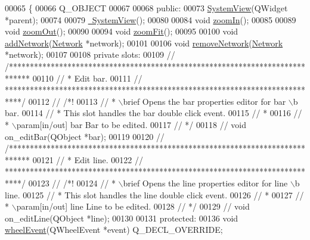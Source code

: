 \begin{DoxyCode}
00065 \{
00066   Q\_OBJECT
00067 
00068 \textcolor{keyword}{public}:
00073   \hyperlink{group___graphics_ga660a455ff7b98cb92410b0bf1cbb2eeb}{SystemView}(QWidget *parent);
00074 
00079   \hyperlink{group___graphics_ga0091352981c1efa5498819b69698db44}{~SystemView}();
00080 
00084   \textcolor{keywordtype}{void} \hyperlink{group___graphics_ga93170319ee5fbf9098353b383fc8a368}{zoomIn}();
00085 
00089   \textcolor{keywordtype}{void} \hyperlink{group___graphics_gaf971471c76265ec21cdde2aafe9b609f}{zoomOut}();
00090 
00094   \textcolor{keywordtype}{void} \hyperlink{group___graphics_gac1bf0b6a80216df74a8da1cb8ac5f0e8}{zoomFit}();
00095 
00100   \textcolor{keywordtype}{void} \hyperlink{group___graphics_gae183447d0777c7b2b940a977f9b64c3f}{addNetwork}(\hyperlink{class_network}{Network} *network);
00101 
00106   \textcolor{keywordtype}{void} \hyperlink{group___graphics_ga2078ad08ff93b9a8683d567e3f9f714e}{removeNetwork}(\hyperlink{class_network}{Network} *network);
00107 
00108 \textcolor{keyword}{private} slots:
00109 \textcolor{comment}{//  /*****************************************************************************}
00110 \textcolor{comment}{//   * Edit bar.}
00111 \textcolor{comment}{//   ****************************************************************************/}
00112 \textcolor{comment}{//  /*!}
00113 \textcolor{comment}{//   * \(\backslash\)brief Opens the bar properties editor for bar \(\backslash\)b bar.}
00114 \textcolor{comment}{//   * This slot handles the bar double click event.}
00115 \textcolor{comment}{//   *}
00116 \textcolor{comment}{//   * \(\backslash\)param[in/out] bar Bar to be edited.}
00117 \textcolor{comment}{//   */}
00118 \textcolor{comment}{//  void on\_editBar(QObject *bar);}
00119 
00120 \textcolor{comment}{//  /*****************************************************************************}
00121 \textcolor{comment}{//   * Edit line.}
00122 \textcolor{comment}{//   ****************************************************************************/}
00123 \textcolor{comment}{//  /*!}
00124 \textcolor{comment}{//   * \(\backslash\)brief Opens the line properties editor for line \(\backslash\)b line.}
00125 \textcolor{comment}{//   * This slot handles the line double click event.}
00126 \textcolor{comment}{//   *}
00127 \textcolor{comment}{//   * \(\backslash\)param[in/out] line Line to be edited.}
00128 \textcolor{comment}{//   */}
00129 \textcolor{comment}{//  void on\_editLine(QObject *line);}
00130 
00131 \textcolor{keyword}{protected}:
00136   \textcolor{keywordtype}{void} \hyperlink{group___graphics_gaab2fa6cebf9022eb6bf31497c0789675}{wheelEvent}(QWheelEvent *event) Q\_DECL\_OVERRIDE;

\end{DoxyCode}
